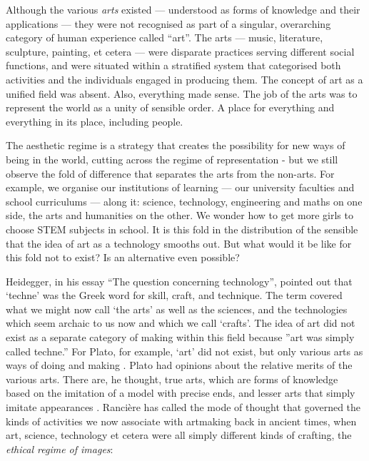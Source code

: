 \documentclass[letterpaper]{article}
\begin{document}
    Although the various \emph{arts} existed — understood as forms of knowledge and their applications — they were not recognised as part of a singular, overarching category of human experience called “art”. The arts — music, literature, sculpture, painting, et cetera — were disparate practices serving different social functions, and were situated within a stratified system that categorised both activities and the individuals engaged in producing them. The concept of art as a unified field was absent. Also, everything made sense. The job of the arts was to represent the world as a unity of sensible order. A place for everything and everything in its place, including people.
    
    The aesthetic regime is a strategy that creates the possibility for new ways of being in the world, cutting across the regime of representation - but we still observe the fold of difference that separates the arts from the non-arts. For example, we organise our institutions of learning — our university faculties and school curriculums — along it: science, technology, engineering and maths on one side, the arts and humanities on the other. We wonder how to get more girls to choose STEM subjects in school. It is this fold in the distribution of the sensible that the idea of art as a technology smooths out. But what would it be like for this fold not to exist? Is an alternative even possible?

    Heidegger, in his essay “The question concerning technology”, pointed out that ‘techne’ was the Greek word for skill, craft, and technique. The term covered what we might now call ‘the arts’ as well as the sciences, and the technologies which seem archaic to us now and which we call ‘crafts’. The idea of art did not exist as a separate category of making within this field because ”art was simply called techne.” \citep[p34]{HeideggerThQstnCncrngTchnlgy1954} For Plato, for example, ‘art’ did not exist, but only various arts as ways of doing and making \citep[p.20]{RancierPltcsOfThAsthtcs2004}. Plato had opinions about the relative merits of the various arts. There are, he thought, true arts, which are forms of knowledge based on the imitation of a model with precise ends, and lesser arts that simply imitate appearances \citep[p.20]{RancierPltcsOfThAsthtcs2004}.  Rancière has called the mode of thought that governed the kinds of activities we now associate with artmaking back in ancient times, when art, science, technology et cetera were all simply different kinds of crafting, the \emph{ethical regime of images}:
\end{document}
